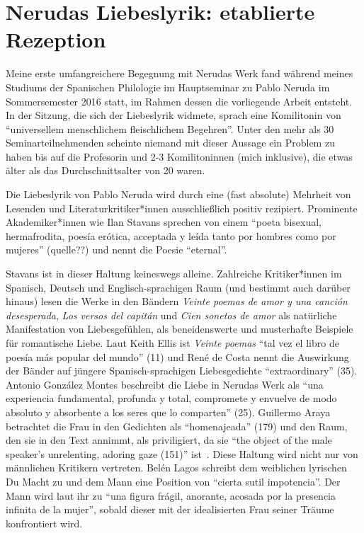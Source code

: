 \section{Nerudas Liebeslyrik: etablierte Rezeption}

Meine erste umfangreichere Begegnung mit Nerudas Werk fand während meines Studiums der Spanischen Philologie im Hauptseminar zu Pablo Neruda im Sommersemester 2016 statt, im Rahmen dessen die vorliegende Arbeit entsteht.
In der Sitzung, die sich der Liebeslyrik widmete, sprach eine Komilitonin von ``universellem menschlichem fleischlichem Begehren''.
Unter den mehr als 30 Seminarteilnehmenden scheinte niemand mit dieser Aussage ein Problem zu haben bis auf die Profesorin und 2-3 Komilitoninnen (mich inklusive), die etwas älter als das Durchschnittsalter von 20 waren.

Die Liebeslyrik von Pablo Neruda wird durch eine (fast absolute) Mehrheit von Lesenden und Literaturkritiker*innen ausschließlich positiv rezipiert.
Prominente Akademiker*innen wie Ilan Stavans sprechen von einem ``poeta bisexual, hermafrodita, poesía erótica, acceptada y leída tanto por hombres como por mujeres'' (quelle??)
und nennt die Poesie ``eternal''\cite{Stavans2014}.

Stavans ist in dieser Haltung keineswegs alleine.
Zahlreiche Kritiker*innen im Spanisch, Deutsch und Englisch-sprachigen Raum (und bestimmt auch darüber hinaus) lesen die Werke in den Bändern \textit{Veinte poemas de amor y una canción desesperada}, \textit{Los versos del capitán} und \textit{Cien sonetos de amor} als natürliche Manifestation von Liebesgefühlen, als beneidenswerte und musterhafte Beispiele für romantische Liebe.
Laut Keith Ellis ist \textit{Veinte poemas} ``tal vez el libro de poesía más popular del mundo'' (11)
und René de Costa nennt die Auswirkung der Bänder auf jüngere Spanisch-sprachigen Liebesgedichte ``extraordinary'' (35). %
Antonio González Montes beschreibt die Liebe in Nerudas Werk als ``una experiencia fundamental, profunda y total, compromete y envuelve de modo absoluto y absorbente a los seres que lo comparten'' (25).
Guillermo Araya betrachtet die Frau in den Gedichten als ``homenajeada'' (179) und den Raum, den sie in den Text annimmt, als priviligiert, da sie ``the object of the male speaker's unrelenting, adoring gaze (151)'' ist~\cite{Duncan1992}.
Diese Haltung wird nicht nur von männlichen Kritikern vertreten.
Belén Lagos schreibt dem weiblichen lyrischen Du Macht zu und dem Mann eine Position von ``cierta sutil impotencia''.
Der Mann wird laut ihr zu ``una figura frágil, anorante, acosada por la presencia infinita de la mujer'', sobald dieser mit der idealisierten Frau seiner Träume konfrontiert wird.

